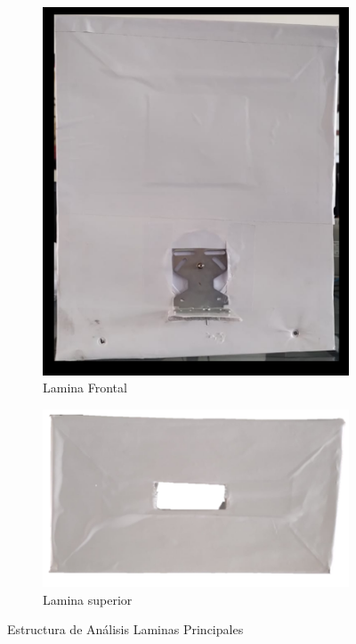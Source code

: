 \begin{figure}[h!]
	\centering
	\begin{subfigure}{0.45\linewidth}
		\centering
		\includegraphics[scale=0.3]{Figs/300.png}
		\caption{Lamina Frontal}
		\label{fig:frontal}
	\end{subfigure}
	\begin{subfigure}{0.45\linewidth}
		\centering
		\includegraphics[scale=0.5]{Figs/301.png}
		\caption{Lamina superior}
		\label{fig:superior}
	\end{subfigure}
	\caption{Estructura de Análisis Laminas Principales}
	\label{fig:estructura}
\end{figure} 

